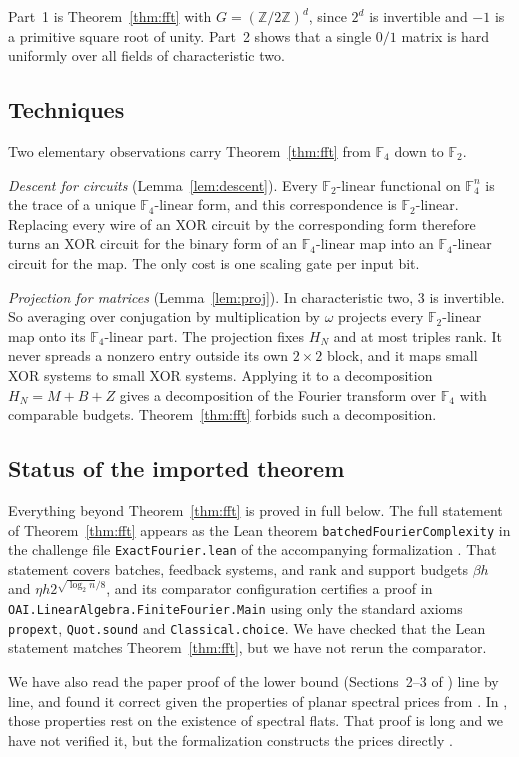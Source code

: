 \documentclass[11pt]{article}
\theoremstyle{definition}
\theoremstyle{remark}
\newcommand{\F}{\mathbb{F}}
\newcommand{\Z}{\mathbb{Z}}
\begin{document}
Part~1 is Theorem~\ref{thm:fft} with $G=(\Z/2\Z)^d$, since $2^d$ is
invertible and $-1$ is a primitive square root of unity. Part~2 shows that
a single $0/1$ matrix is hard uniformly over all fields of characteristic
two.

\subsection{Techniques}
Two elementary observations carry Theorem~\ref{thm:fft} from $\F_4$ down
to $\F_2$.

\emph{Descent for circuits} (Lemma~\ref{lem:descent}). Every
$\F_2$-linear functional on $\F_4^n$ is the trace of a unique
$\F_4$-linear form, and this correspondence is $\F_2$-linear. Replacing
every wire of an XOR circuit by the corresponding form therefore turns an
XOR circuit for the binary form of an $\F_4$-linear map into an
$\F_4$-linear circuit for the map. The only cost is one scaling gate per
input bit.

\emph{Projection for matrices} (Lemma~\ref{lem:proj}). In characteristic
two, $3$ is invertible. So averaging over conjugation by multiplication by
$\omega$ projects every $\F_2$-linear map onto its $\F_4$-linear part. The
projection fixes $H_N$ and at most triples rank. It never spreads a
nonzero entry outside its own $2\times2$ block, and it maps small XOR
systems to small XOR systems. Applying it to a decomposition
$H_N=M+B+Z$ gives a decomposition of the Fourier transform over $\F_4$
with comparable budgets. Theorem~\ref{thm:fft} forbids such a
decomposition.

\subsection{Status of the imported theorem}
Everything beyond Theorem~\ref{thm:fft} is proved in full below. The full
statement of Theorem~\ref{thm:fft} appears as the Lean theorem
\texttt{batchedFourierComplexity} in the challenge file
\texttt{ExactFourier.lean} of the accompanying formalization \cite{Lean}.
That statement covers batches, feedback systems, and rank and support
budgets $\beta h$ and $\eta h2^{\sqrt{\log_2n}/8}$, and its comparator
configuration certifies a proof in \texttt{OAI.LinearAlgebra.FiniteFourier.Main}
using only the standard axioms \texttt{propext}, \texttt{Quot.sound} and
\texttt{Classical.choice}. We have checked that the Lean statement matches
Theorem~\ref{thm:fft}, but we have not rerun the comparator.

We have also read the paper proof of the lower bound (Sections~2--3 of
\cite{FFT}) line by line, and found it correct given the properties of
planar spectral prices from \cite[Theorem~1.1]{Geom}. In \cite{Geom},
those properties rest on the existence of spectral flats. That proof is
long and we have not verified it, but the formalization constructs the
prices directly \cite{Lean}.
\end{document}
